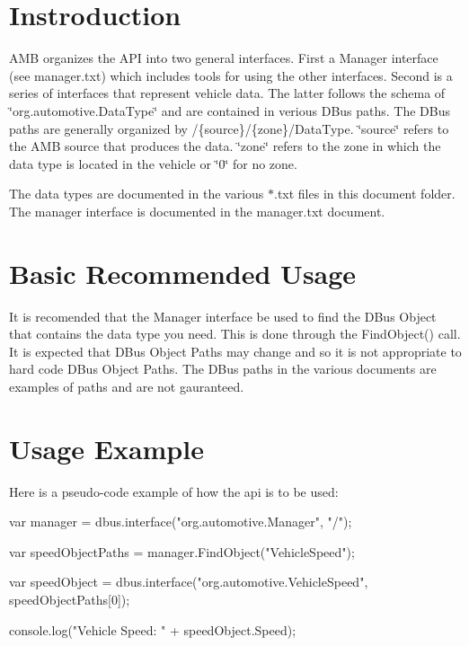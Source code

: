 \hypertarget{index_intro}{}\section{Instroduction}\label{index_intro}
A\-M\-B organizes the A\-P\-I into two general interfaces. First a Manager interface (see manager.\-txt) which includes tools for using the other interfaces. Second is a series of interfaces that represent vehicle data. The latter follows the schema of \char`\"{}org.\-automotive.\-Data\-Type\char`\"{} and are contained in verious D\-Bus paths. The D\-Bus paths are generally organized by /\{source\}/\{zone\}/\-Data\-Type. \char`\"{}source\char`\"{} refers to the A\-M\-B source that produces the data. \char`\"{}zone\char`\"{} refers to the zone in which the data type is located in the vehicle or \char`\"{}0\char`\"{} for no zone.

The data types are documented in the various $\ast$.txt files in this document folder. The manager interface is documented in the manager.\-txt document.\hypertarget{index_basic_usage}{}\section{Basic Recommended Usage}\label{index_basic_usage}
It is recomended that the Manager interface be used to find the D\-Bus Object that contains the data type you need. This is done through the Find\-Object() call. It is expected that D\-Bus Object Paths may change and so it is not appropriate to hard code D\-Bus Object Paths. The D\-Bus paths in the various documents are examples of paths and are not gauranteed.\hypertarget{index_example}{}\section{Usage Example}\label{index_example}
Here is a pseudo-\/code example of how the api is to be used\-:


\begin{DoxyCode}
var manager = dbus.interface(\textcolor{stringliteral}{"org.automotive.Manager"}, \textcolor{stringliteral}{"/"});

var speedObjectPaths = manager.FindObject(\textcolor{stringliteral}{"VehicleSpeed"});

var speedObject = dbus.interface(\textcolor{stringliteral}{"org.automotive.VehicleSpeed"}, speedObjectPaths[0]);

console.log(\textcolor{stringliteral}{"Vehicle Speed: "} + speedObject.Speed);
\end{DoxyCode}
 
